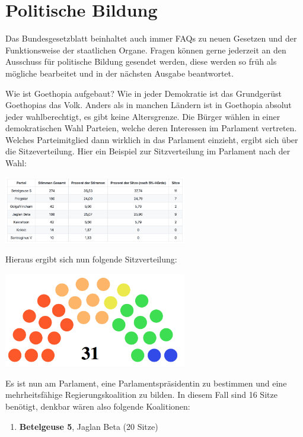 \documentclass{sasbase}
\begin{document}
\section{Politische Bildung}
Das Bundesgesetzblatt beinhaltet auch immer FAQs zu neuen Gesetzen und der Funktionsweise der staatlichen Organe.
Fragen k\"{o}nnen gerne jederzeit an den Ausschuss f\"{u}r politische Bildung gesendet werden, diese werden so fr\"{u}h als m\"{o}gliche bearbeitet und in der n\"{a}chsten Ausgabe beantwortet.

\begin{question}{Wie ist Goethopia aufgebaut?}
	Wie in jeder Demokratie ist das Grundger\"{u}st Goethopias das Volk. Anders als in manchen L\"{a}ndern ist in Goethopia absolut jeder wahlberechtigt, es gibt keine Altersgrenze. Die B\"{u}rger w\"{a}hlen in einer demokratischen Wahl Parteien, welche deren Interessen im Parlament vertreten. Welches Parteimitglied dann wirklich in das Parlament einzieht, ergibt sich \"{u}ber die Sitzeverteilung. Hier ein Beispiel zur Sitzverteilung im Parlament nach der Wahl:
	\begin{center}
		\includegraphics[width=8cm]{Tabelle_Beispiel_Sitzverteilung.png}
	\end{center}
	Hieraus ergibt sich nun folgende Sitzverteilung:
	\begin{center}
	\includegraphics[width=8cm]{Parlament.png}
	\end{center}
Es ist nun am Parlament, eine Parlamentspr\"{a}sidentin zu bestimmen und eine mehrheitsf\"{a}hige Regierungskoalition zu bilden. In diesem Fall sind 16 Sitze ben\"{o}tigt, denkbar w\"{a}ren also folgende Koalitionen:
	\begin{enumerate}[label=-]
		\item \textbf{Betelgeuse 5}, Jaglan Beta (20 Sitze)

\end{enumerate}
\end{question}
\end{document}
